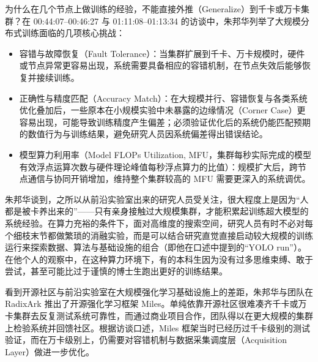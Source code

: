 \documentclass[UTF8,a4paper,11pt,fontset=fandol]{ctexart}
\begin{document}
为什么在几个节点上做训练的经验，不能直接外推（Generalize）到千卡或万卡集群？在 00:44:07–00:46:27 与 01:11:08–01:13:34 的访谈中，朱邦华列举了大规模分布式训练面临的几项核心挑战：
\begin{itemize}
\item 容错与故障恢复（Fault Tolerance）：当集群扩展到千卡、万卡规模时，硬件或节点异常更容易出现，系统需要具备相应的容错机制，在节点失效后能够恢复并接续训练。
\item 正确性与精度匹配（Accuracy Match）：在大规模并行、容错恢复与各类系统优化叠加后，一些原本在小规模实验中未暴露的边缘情况（Corner Case）更容易出现，可能导致训练精度产生偏差；必须验证优化后的系统仍能匹配预期的数值行为与训练结果，避免研究人员因系统偏差得出错误结论。
\item 模型算力利用率（Model FLOPs Utilization, MFU，集群每秒实际完成的模型有效浮点运算次数与硬件理论峰值每秒浮点算力的比值）：规模扩大后，跨节点通信与协同开销增加，维持整个集群较高的 MFU 需要更深入的系统调优。
\end{itemize}

朱邦华谈到，之所以从前沿实验室出来的研究人员受关注，很大程度上是因为“人都是被卡养出来的”——只有亲身接触过大规模集群，才能积累起训练超大模型的系统经验。在算力充裕的条件下，面对高维度的搜索空间，研究人员有时不必对每个细枝末节都做繁琐的消融实验，而是可以结合研究直觉直接启动较大规模的训练运行来探索数据、算法与基础设施的组合（即他在口述中提到的“YOLO run”）。在他个人的观察中，在这种算力环境下，有的本科生因为没有过多思维束缚、敢于尝试，甚至可能比过于谨慎的博士生跑出更好的训练结果。

看到开源社区与前沿实验室在大规模强化学习基础设施上的差距，朱邦华与团队在 RadixArk 推出了开源强化学习框架 Miles。单纯依靠开源社区很难凑齐千卡或万卡集群去反复测试系统可靠性，而通过商业项目合作，团队得以在更大规模的集群上检验系统并回馈社区。根据访谈口述，Miles 框架当时已经历过千卡级别的测试验证，而在万卡级别上，仍需要对容错机制与数据采集调度层（Acquisition Layer）做进一步优化。
\end{document}
